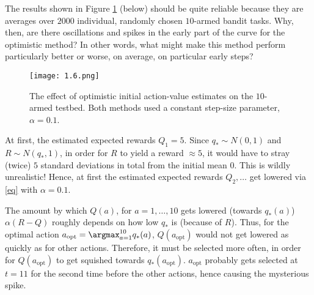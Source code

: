 
\begin{exercise}

The results shown in Figure \ref{fig:1.6} (below) should be quite reliable because they are averages over $2000$ individual, randomly chosen $10$-armed bandit tasks.
Why, then, are there oscillations and spikes in the early part of the curve for the optimistic method?
In other words, what might make this method perform particularly better or worse, on average, on particular early steps?

\begin{figure}[H]
    \centering
    \texttt{[image: 1.6.png]}
    \caption
    {
        The effect of optimistic initial action-value estimates on the $10$-armed testbed.
        Both methods used a constant step-size parameter, $\alpha = 0.1$.
    }
    \label{fig:1.6}
\end{figure}

\end{exercise}


\begin{solution}

At first, the estimated expected rewards $Q_1 = 5$.
Since $q_\ast \sim N(0, 1)$ and $R \sim N(q_\ast, 1)$, in order for $R$ to yield a reward $\approx 5$, it would have to stray (twice) $5$ standard deviations in total from the initial mean $0$.
This is wildly unrealistic!
Hence, at first the estimated expected rewards $Q_2, \dots$ get lowered via \eqref{eq} with $\alpha = 0.1$.

The amount by which $Q(a)$, for $a = 1, \dots, 10$ gets lowered (towards $q_\ast(a)$) $\alpha (R - Q)$ roughly depends on how low $q_\ast$ is (because of $R$).
Thus, for the optimal action $a_\text{opt} = \argmax_{a=1}^{10} q_\ast(a)$, $Q(a_\text{opt})$ would not get lowered as quickly as for other actions.
Therefore, it must be selected more often, in order for $Q(a_\text{opt})$ to get squished towards $q_\ast(a_\text{opt})$.
$a_\text{opt}$ probably gets selected at $t = 11$ for the second time before the other actions, hence causing the mysterious spike.

\end{solution}


